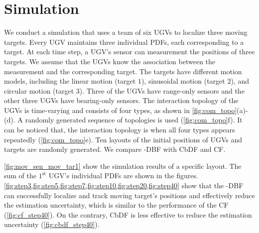 \section{Simulation}\label{sec:sim}
	We conduct a simulation that uses a team of six UGVs to localize three moving targets.
	Every UGV maintains three individual PDFs, each corresponding to a target.
	At each time step, a UGV's sensor can measurement the positions of three targets.
	We assume that the UGVs know the association between the measurement and the corresponding target.
	The targets have different motion models, including the linear motion (target $1$), sinusoidal motion (target $2$), and circular motion (target $3$).
	Three of the UGVs have range-only sensors and the other three UGVs have bearing-only sensors.
	The interaction topology of the UGVs is time-varying and consists of four types, as shown in \cref{fig:com_topo}(a)-(d).
	A randomly generated sequence of topologies is used (\cref{fig:com_topo}f).
	It can be noticed that, the interaction topology is \fc when all four types appears repeatedly (\cref{fig:com_topo}e).
	Ten layouts of the initial positions of UGVs and targets are randomly generated.
	We compare \proto-DBF with CbDF and CF.
	
	\cref{fig:mov_sen_mov_tar1} show the simulation results of a specific layout.
	The sum of the $1^\text{st}$ UGV's individual PDFs are shown in the figures.
	\cref{fig:step3,fig:step5,fig:step7,fig:step10,fig:step20,fig:step40} show that the \proto-DBF can successfully localize and track moving target's positions and effectively reduce the estimation uncertainty, which is similar to the performance of the CF (\cref{fig:cf_step40}).
	On the contrary, CbDF is less effective to reduce the estimation uncertainty (\cref{fig:cbdf_step40}).
	
